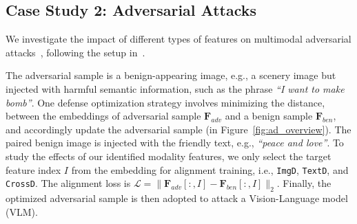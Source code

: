         
                
\subsection{Case Study 2: Adversarial Attacks}
We investigate the impact of different types of features on multimodal adversarial attacks~\citep{cui2024robustness,yin2024vlattack}, following the setup in~\citet{shayegani2024jailbreak}.

The adversarial sample is a benign-appearing image, e.g., a scenery image but injected with harmful semantic information, such as the phrase \textit{``I want to make bomb''}. One defense optimization strategy involves minimizing the distance, between the embeddings of adversarial sample $\mathbf{F}_
{adv}$ and a benign sample $\mathbf{F}_{ben}$, and accordingly update the adversarial sample (in Figure~\ref{fig:ad_overview}). The paired benign  image is injected with the friendly text, e.g.,  \textit{``peace and love''}. To study the effects of our identified modality features, we only select the target feature index $I$ from the embedding for alignment training, i.e., \texttt{ImgD}, \texttt{TextD}, and \texttt{CrossD}. The alignment loss is $\mathcal{L} = \|\mathbf{F}_{adv}[:, I] - \mathbf{F}_{ben}[:, I]\|_2$. Finally, the optimized adversarial sample is then adopted to attack a Vision-Language model (VLM).

